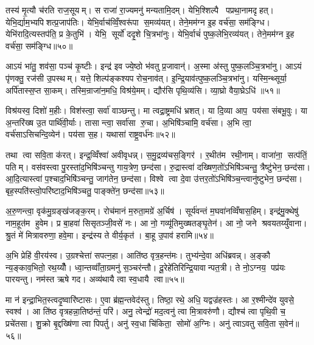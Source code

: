 तस्य॑ मृ॒त्यौ च॑रति राज॒सूयम्। स राजा॑ रा॒ज्यमनु॑ मन्यतामि॒दम्। येभि॒श्शिल्पै पप्रथा॒नामदृहत्। येभि॒र्द्याम॒भ्यपिशत्प्र॒जाप॑तिः। येभि॒र्वाच॑व्विँ॒श्वरू॑पा स॒मव्य॑यत्। तेने॒मम॑ग्न इ॒ह वर्च॑सा॒ सम॑ङ्ग्धि। येभि॑रादि॒त्यस्तप॑ति॒ प्र के॒तुभि॑। येभि॒ सूर्यो॑ ददृ॒शे चि॒त्रभा॑नुः। येभि॒र्वाचं॑ पुष्क॒लेभि॒रव्य॑यत्। तेने॒मम॑ग्न इ॒ह वर्च॑सा॒ सम॑ङ्ग्धि॥५०॥

आऽयं भा॑तु॒ शव॑सा॒ पञ्च॑ कृ॒ष्टीः। इन्द्र॑ इव ज्ये॒ष्ठो भ॑वतु प्र॒जावान्॑। अ॒स्मा अ॑स्तु पुष्क॒लञ्चि॒त्रभा॑नु। आऽयं पृ॑णक्तु॒ रज॑सी उ॒पस्थम्। यत्ते॒ शिल्प॑ङ्कश्यप रोच॒नाव॑त्। इ॒न्द्रि॒याव॑त्पुष्क॒लञ्चि॒त्रभा॑नु। यस्मि॒न्थ्सूर्या॒ अर्पि॑तास्स॒प्त सा॒कम्। तस्मि॒न्राजा॑न॒मधि॒ विश्र॑ये॒मम्। द्यौर॑सि पृथि॒व्य॑सि। व्या॒घ्रो वैया॒घ्रेऽधि॑ ॥५१॥

विश्र॑यस्व॒ दिशो॑ म॒हीः। विश॑स्त्वा॒ सर्वा॑ वाञ्छन्तु। मा त्वद्रा॒ष्ट्रमधि॑ भ्रशत्। या दि॒व्या आप॒ पय॑सा संबभू॒वुः। या अ॒न्तरि॑ख्ष उ॒त पार्थि॑वी॒र्याः। तासान्त्वा॒ सर्वा॑सा रु॒चा। अ॒भिषि॑ञ्चामि॒ वर्च॑सा। अ॒भि त्वा॒ वर्च॑साऽसिचन्दि॒व्येन॑। पय॑सा स॒ह। यथासा॑ राष्ट्र॒वर्ध॑नः॥५२॥

तथा त्वा सवि॒ता क॑रत्। इन्द्र॒व्विँश्वा॑ अवीवृधन्न्। स॒मु॒द्रव्य॑चस॒ङ्गिर॑। र॒थीत॑म रथी॒नाम्। वाजा॑ना॒ सत्प॑तिं॒ पतिम्। वस॑वस्त्वा पु॒रस्ता॑द॒भिषि॑ञ्चन्तु गाय॒त्रेण॒ छन्द॑सा। रु॒द्रास्त्वा॑ दख्षिण॒तो॑ऽभिषि॑ञ्चन्तु॒ त्रैष्टु॑भेन॒ छन्द॑सा। आ॒दि॒त्यास्त्वा॑ प॒श्चाद॒भिषि॑ञ्चन्तु॒ जाग॑तेन॒ छन्द॑सा। विश्वे त्वा दे॒वा उ॑त्तर॒तो॑ऽभिषि॑ञ्च॒न्त्वानु॑ष्टुभेन॒ छन्द॑सा। बृह॒स्पति॑स्त्वो॒परि॑ष्टाद॒भिषि॑ञ्चतु॒ पाङ्क्ते॑न॒ छन्द॑सा॥५३॥

अ॒रु॒णन्त्वा॒ वृक॑मु॒ग्रङ्ख॑जङ्क॒रम्। रोच॑मानं म॒रुता॒मग्रे॑ अ॒र्चिष॑। सूर्य॑वन्तं म॒घवा॑नव्विँषास॒हिम्। इन्द्र॑मु॒क्थेषु॑ नाम॒हूत॑म हुवेम। प्र बा॒हवा॑ सिसृतञ्जी॒वसे॑ नः। आ नो॒ गव्यू॑तिमुख्षतङ्घृ॒तेन॑। आ नो॒ जने श्रवयतय्युँवाना। श्रु॒तं मे॑ मित्रावरुणा॒ हवे॒मा। इन्द्र॑स्य ते वीर्य॒कृत॑। बा॒हू उ॒पाव॑ हरामि॥५४॥\anuvakamend[ब॒भू॒वाव्य॑य॒त्तेने॒मम॑ग्न इ॒ह वर्च॑सा॒ सम॑ङ्ग्धि॒ वैया॒घ्रेऽधि॑ राष्ट्र॒वर्ध॑न॒पाङ्क्ते॑न॒ छन्द॑सो॒पाव॑हरामि]

अ॒भि प्रेहि॑ वी॒रय॑स्व। उ॒ग्रश्चेत्ता॑ सपत्न॒हा। आति॑ष्ठ वृत्र॒हन्त॑मः। तुभ्य॑न्दे॒वा अधि॑ब्रवन्न्। अ॒ङ्कौ न्य॒ङ्काव॒भितो॒ रथ॒य्यौँ। ध्वा॒न्तव्वाँ॑ता॒ग्रमनु॑ स॒ञ्चर॑न्तौ। दू॒रेहे॑तिरिन्द्रि॒यावान्पत॒त्री। ते नो॒ऽग्नय॒ पप्र॑यः पारयन्तु। नम॑स्त ऋषे गद। अव्य॑थायै त्वा स्व॒धायै त्वा॥५५॥

मा न॑ इन्द्रा॒भित॒स्त्वदृ॒ष्वारि॑ष्टासः। ए॒वा ब्र॑ह्म॒न्तवेद॑स्तु। तिष्ठा॒ रथे॒ अधि॒ यद्वज्र॑हस्तः। आ र॒श्मीन्दे॑व युवसे॒ स्वश्व॑। आ ति॑ष्ठ वृत्रहन्ना॒तिष्ठ॑न्तं॒ परि॑। अनु॒ त्वेन्द्रो॑ मद॒त्वनु॑ त्वा मि॒त्रावरु॑णौ। द्यौश्च॑ त्वा पृथि॒वी च॒ प्रचे॑तसा। शु॒क्रो बृ॒द्दख्षि॑णा त्वा पिपर्तु। अनु॑ स्व॒धा चि॑किता॒ सोमो॑ अ॒ग्निः। अनु॑ त्वाऽवतु सवि॒ता स॒वेन॑॥५६॥

